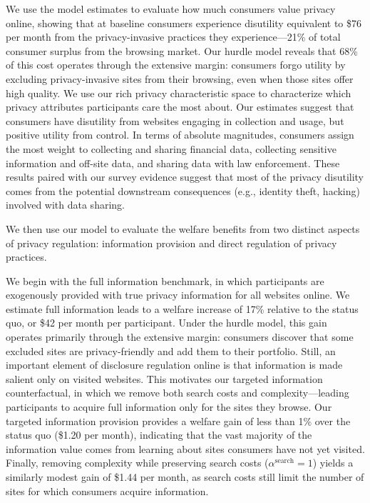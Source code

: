 \documentclass[12pt]{article}
\theoremstyle{definition}
\theoremstyle{remark}
\begin{document}
We use the model estimates to evaluate how much consumers value privacy online, showing that at baseline consumers experience disutility equivalent to \$76 per month from the privacy-invasive practices they experience---21\% of total consumer surplus from the browsing market. %
Our hurdle model reveals that 68\% of this cost operates through the extensive margin: consumers forgo utility by excluding privacy-invasive sites from their browsing, even when those sites offer high quality. %
We use our rich privacy characteristic space to characterize which privacy attributes participants care the most about. Our estimates suggest that consumers have disutility from websites engaging in collection and usage, but positive utility from control. In terms of absolute magnitudes, consumers assign the most weight to collecting and sharing financial data, collecting sensitive information and off-site data, and sharing data with law enforcement. These results paired with our survey evidence suggest that most of the privacy disutility comes from the potential downstream consequences (e.g., identity theft, hacking) involved with data sharing.

We then use our model to evaluate the welfare benefits from two distinct aspects of privacy regulation: information provision and direct regulation of privacy practices.

We begin with the full information benchmark, in which participants are exogenously provided with true privacy information for all websites online. We estimate full information leads to a welfare increase of 17\% relative to the status quo, or \$42 per month per participant. %
Under the hurdle model, this gain operates primarily through the extensive margin: consumers discover that some excluded sites are privacy-friendly and add them to their portfolio. Still, an important element of disclosure regulation online is that information is made salient only on visited websites. This motivates our targeted information counterfactual, in which we remove both search costs and complexity---leading participants to acquire full information only for the sites they browse. Our targeted information provision provides a welfare gain of less than 1\% over the status quo (\$1.20 per month), indicating that the vast majority of the information value comes from learning about sites consumers have not yet visited. %
Finally, removing complexity while preserving search costs ($\alpha^{\text{search}} = 1$) yields a similarly modest gain of \$1.44 per month, as search costs still limit the number of sites for which consumers acquire information. %
\end{document}
